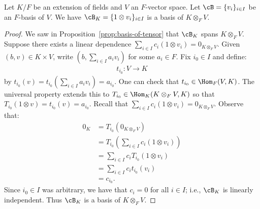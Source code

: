     \begin{proposition}
        Let $K/F$ be an extension of fields and $V$ an $F$-vector space. Let $\cB = \{v_i\}_{i \in I}$ be an $F$-basis of $V$. We have $\cB_K = \{1 \otimes v_i\}_{i \in I}$ is a basis of $K \otimes_F V$.
    \end{proposition}
        \begin{proof}
            We saw in Proposition~\ref{prop:basis-of-tensor} that $\cB_K$ spans $K \otimes_F V$. Suppose there exists a linear dependence $\sum_{i \in I}c_i(1 \otimes v_i) = 0_{K \otimes_F V}$. Given $(b,v) \in K \times V$, write $(b,\sum_{i \in I}a_i v_i)$ for some $a_i \in F$. Fix $i_0 \in I$ and define:
                \begin{equation*}
                \begin{split}
                    t_{i_0}: V \rightarrow K
                \end{split}
                \end{equation*}
            by $t_{i_0}(v) = t_{i_0}(\sum_{i \in I}a_i v_i) = a_{i_0}$. One can check that $t_{i_0} \in \Hom_F(V,K)$. The universal property extends this to $T_{i_0} \in \Hom_K(K \otimes_F V, K)$ so that $T_{i_0}(1 \otimes v) = t_{i_0}(v) = a_{i_0}$. Recall that $\sum_{i \in I}c_i(1 \otimes v_i) = 0_{K \otimes_F V}$. Observe that:
                \begin{equation*}
                \begin{split}
                    0_K 
                    &= T_{i_0}(0_{K \otimes_F V}) \\
                    & = T_{i_0}\left(\sum_{i \in I}c_i (1 \otimes v_i)\right) \\
                    & = \sum_{i \in I}c_i T_{i_0}(1 \otimes v_i) \\
                    & = \sum_{i \in I}c_i t_{i_0}(v_i) \\
                    & = c_{i_0}.
                \end{split}
                \end{equation*}
            Since $i_0 \in I$ was arbitrary, we have that $c_i = 0$ for all $i \in I$; i.e., $\cB_K$ is linearly independent. Thus $\cB_K$ is a basis of $K \otimes_F V$.
        \end{proof}

